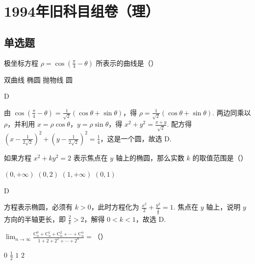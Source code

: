 \chapter{1994年旧科目组卷（理）}

\section{单选题}

\begin{problem}
极坐标方程 \(\rho = \cos \left(\frac{\pi}{4} - \theta\right)\) 所表示的曲线是（\quad）

\choices
    {双曲线}
    {椭圆}
    {抛物线}
    {圆}
\end{problem}

\begin{answer}
D
\end{answer}

\begin{solution}
由 \(\cos \left(\frac{\pi}{4} - \theta\right) = \frac{1}{\sqrt{2}}\left(\cos \theta + \sin \theta\right)\)，得 \(\rho = \frac{1}{\sqrt{2}}\left(\cos \theta + \sin \theta\right)\). 两边同乘以 \(\rho\)，并利用 \(x = \rho \cos \theta\)，\(y = \rho \sin \theta\)，得 \(x^2 + y^2 = \frac{x + y}{\sqrt{2}}\). 配方得 \(\left(x - \frac{1}{2\sqrt{2}}\right)^2 + \left(y - \frac{1}{2\sqrt{2}}\right)^2 = \frac{1}{4}\)，这是一个圆，故选 D.
\end{solution}

\begin{problem}
如果方程 \(x^2 + ky^2 = 2\) 表示焦点在 \(y\) 轴上的椭圆，那么实数 \(k\) 的取值范围是（\quad）

\choices
    {\((0, +\infty)\)}
    {\((0, 2)\)}
    {\((1, +\infty)\)}
    {\((0, 1)\)}
\end{problem}

\begin{answer}
D
\end{answer}

\begin{solution}
方程表示椭圆，必须有 \(k > 0\)，此时方程化为 \(\frac{x^2}{2} + \frac{y^2}{\frac{2}{k}} = 1\). 焦点在 \(y\) 轴上，说明 \(y\) 方向的半轴更长，即 \(\frac{2}{k} > 2\)，解得 \(0 < k < 1\)，故选 D.
\end{solution}

\begin{problem}
\(\displaystyle\lim_{n \to \infty} \frac{\mathrm C_n^0 + \mathrm C_n^1 + \mathrm C_n^2 + \cdots + \mathrm C_n^n}{1 + 2 + 2^2 + \cdots + 2^n} =\)（\quad）

\choices
    {\(0\)}
    {\(\frac{1}{2}\)}
    {\(1\)}
    {\(2\)}
\end{problem}

